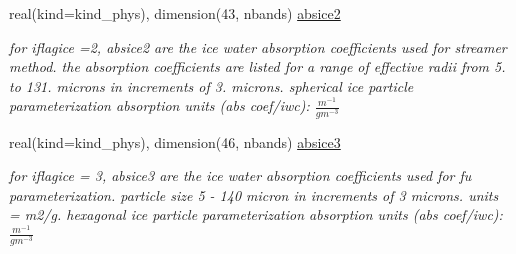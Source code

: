 \begin{DoxyCompactItemize}
real(kind=kind\+\_\+phys), dimension(43, nbands) \hyperlink{namespacemodule__radlw__cldprlw_ad2238686c0e6d1c5d74bcfdde1542e1d}{absice2}
\begin{DoxyCompactList}\small\item\em for iflagice =2, absice2 are the ice water absorption coefficients used for streamer method. the absorption coefficients are listed for a range of effective radii from 5. to 131. microns in increments of 3. microns. spherical ice particle parameterization absorption units (abs coef/iwc)\+: $\frac{m^{-1}}{gm^{-3}}$ \end{DoxyCompactList}\item 
\mbox{\label{namespacemodule__radlw__cldprlw_a3aa04541d0b809367f88ef8aa0eafdbb}} 
real(kind=kind\+\_\+phys), dimension(46, nbands) \hyperlink{namespacemodule__radlw__cldprlw_a3aa04541d0b809367f88ef8aa0eafdbb}{absice3}
\begin{DoxyCompactList}\small\item\em for iflagice = 3, absice3 are the ice water absorption coefficients used for fu parameterization. particle size 5 -\/ 140 micron in increments of 3 microns. units = m2/g. hexagonal ice particle parameterization absorption units (abs coef/iwc)\+: $\frac{m^{-1}}{gm^{-3}}$ \end{DoxyCompactList}\end{DoxyCompactItemize}
